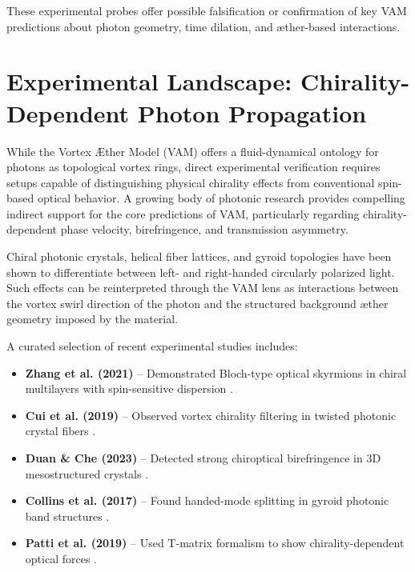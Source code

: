         These experimental probes offer possible falsification or confirmation of key VAM predictions about photon geometry, time dilation, and æther-based interactions.

\section{Experimental Landscape: Chirality-Dependent Photon Propagation}\label{sec:chirality-exp}

        While the Vortex \AE ther Model (VAM) offers a fluid-dynamical ontology for photons as topological vortex rings, direct experimental verification requires setups capable of distinguishing physical chirality effects from conventional spin-based optical behavior. A growing body of photonic research provides compelling indirect support for the core predictions of VAM, particularly regarding chirality-dependent phase velocity, birefringence, and transmission asymmetry.

        Chiral photonic crystals, helical fiber lattices, and gyroid topologies have been shown to differentiate between left- and right-handed circularly polarized light. Such effects can be reinterpreted through the VAM lens as interactions between the vortex swirl direction of the photon and the structured background æther geometry imposed by the material.

        A curated selection of recent experimental studies includes:

        \begin{itemize}
            \item \textbf{Zhang et al. (2021)} – Demonstrated Bloch-type optical skyrmions in chiral multilayers with spin-sensitive dispersion \cite{zhang2021skyrmions}.
            \item \textbf{Cui et al. (2019)} – Observed vortex chirality filtering in twisted photonic crystal fibers \cite{cui2019vortex}.
            \item \textbf{Duan \& Che (2023)} – Detected strong chiroptical birefringence in 3D mesostructured crystals \cite{duan2023chiral}.
            \item \textbf{Collins et al. (2017)} – Found handed-mode splitting in gyroid photonic band structures \cite{collins2017gyroid}.
            \item \textbf{Patti et al. (2019)} – Used T-matrix formalism to show chirality-dependent optical forces \cite{patti2019tweezers}.
        \end{itemize}

